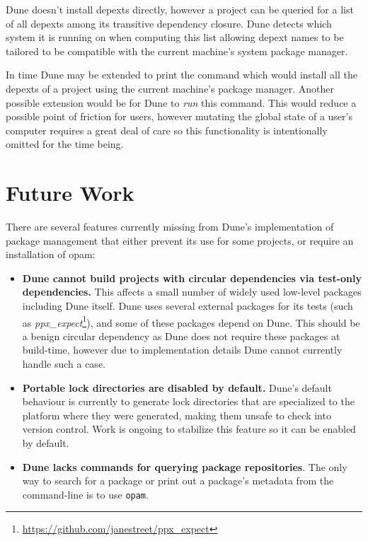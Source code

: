 \documentclass{article}
\begin{document}
\begin{multicols}{2}
        Dune doesn't install depexts directly, however a project
        can be queried for a list of all depexts among its transitive dependency
        closure. Dune detects which system it is running on when computing
        this list allowing depext names to be tailored to be compatible with
        the current machine's system package manager.

        In time Dune may be extended to print the command which would install
        all the depexts of a project using the current machine's package manager.
        Another possible extension would be for Dune to \textit{run} this
        command. This would reduce a possible point of friction for users,
        however mutating the global state of a user's computer requires a great
        deal of care so this functionality is intentionally omitted for the time
        being.

        \section {Future Work}

        There are several features currently missing from Dune's implementation
        of package management that either prevent its use for some projects, or
        require an installation of opam:

        \begin{itemize}
            \item \textbf{Dune cannot build projects with circular dependencies
                via test-only dependencies.} This affects a small number of
                widely used low-level packages including Dune itself. Dune uses
                several external packages for its tests (such as
                \textit{ppx\_expect}\footnote{\url{https://github.com/janestreet/ppx_expect}}),
                and some of these packages depend on
                Dune. This should be a benign circular dependency as Dune does
                not require these packages at build-time, however due to
                implementation details Dune cannot currently handle such a case.
            \item \textbf{Portable lock directories are disabled by default.}
                Dune's default behaviour is currently to generate lock
                directories that are specialized to the platform where they were
                generated, making them unsafe to check into version control.
                Work is ongoing to stabilize this feature so it can be enabled
                by default.
            \item \textbf{Dune lacks commands for querying package
                repositories}. The only way to search for a package or print out
                a package's metadata from the command-line is to use \texttt{opam}.
        \end{itemize}

    \end{multicols}
\end{document}
